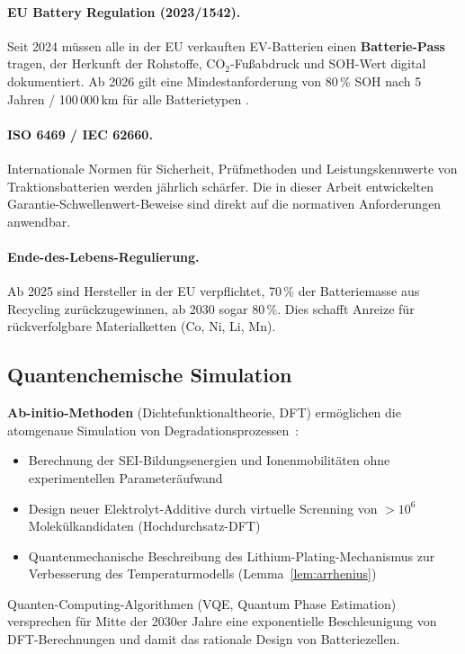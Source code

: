 ﻿\documentclass[a4paper,12pt]{article}
\theoremstyle{definition}
\begin{document}
\paragraph{EU Battery Regulation (2023/1542).}
Seit 2024 m\"ussen alle in der EU verkauften EV-Batterien einen
\textbf{Batterie-Pass} tragen, der Herkunft der Rohstoffe, CO$_2$-Fu\ss{}abdruck
und SOH-Wert digital dokumentiert. Ab 2026 gilt eine Mindestanforderung
von 80\,\% SOH nach 5 Jahren / 100\,000\,km f\"ur alle Batterietypen \cite{EUReg2023}.

\paragraph{ISO 6469 / IEC 62660.}
Internationale Normen f\"ur Sicherheit, Pr\"ufmethoden und Leistungskennwerte
von Traktionsbatterien werden j\"ahrlich sch\"arfer. Die in dieser Arbeit
entwickelten Garantie-Schwellenwert-Beweise sind direkt auf die normativen
Anforderungen anwendbar.

\paragraph{Ende-des-Lebens-Regulierung.}
Ab 2025 sind Hersteller in der EU verpflichtet, 70\,\% der Batteriemasse
aus Recycling zur\"uckzugewinnen, ab 2030 sogar 80\,\%. Dies schafft
Anreize f\"ur r\"uckverfolgbare Materialketten (Co, Ni, Li, Mn).

\subsection{Quantenchemische Simulation}

\textbf{Ab-initio-Methoden} (Dichtefunktionaltheorie, DFT) erm\"oglichen
die atomgenaue Simulation von Degradationsprozessen~\cite{Leung2010}:

\begin{itemize}
  \item Berechnung der SEI-Bildungsenergien und Ionenmobilit\"aten
    ohne experimentellen Parameter\"aufwand
  \item Design neuer Elektrolyt-Additive durch virtuelle Screnning
    von $>10^6$ Molek\"ulkandidaten (Hochdurchsatz-DFT)
  \item Quantenmechanische Beschreibung des Lithium-Plating-Mechanismus
    zur Verbesserung des Temperaturmodells (Lemma~\ref{lem:arrhenius})
\end{itemize}

Quanten-Computing-Algorithmen (VQE, Quantum Phase Estimation) versprechen
f\"ur Mitte der 2030er Jahre eine exponentielle Beschleunigung von
DFT-Berechnungen und damit das rationale Design von Batteriezellen.
\end{document}
